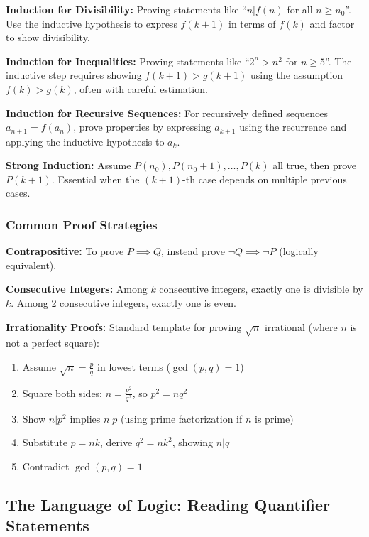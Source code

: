 \documentclass[12pt]{article}
\begin{document}
\textbf{Induction for Divisibility:} Proving statements like ``$n | f(n)$ for all $n \geq n_0$''. Use the inductive hypothesis to express $f(k+1)$ in terms of $f(k)$ and factor to show divisibility.

\textbf{Induction for Inequalities:} Proving statements like ``$2^n > n^2$ for $n \geq 5$''. The inductive step requires showing $f(k+1) > g(k+1)$ using the assumption $f(k) > g(k)$, often with careful estimation.

\textbf{Induction for Recursive Sequences:} For recursively defined sequences $a_{n+1} = f(a_n)$, prove properties by expressing $a_{k+1}$ using the recurrence and applying the inductive hypothesis to $a_k$.

\textbf{Strong Induction:} Assume $P(n_0), P(n_0+1), \ldots, P(k)$ all true, then prove $P(k+1)$. Essential when the $(k+1)$-th case depends on multiple previous cases.

\subsubsection*{Common Proof Strategies}

\textbf{Contrapositive:} To prove $P \implies Q$, instead prove $\neg Q \implies \neg P$ (logically equivalent).

\textbf{Consecutive Integers:} Among $k$ consecutive integers, exactly one is divisible by $k$. Among 2 consecutive integers, exactly one is even.

\textbf{Irrationality Proofs:} Standard template for proving $\sqrt{n}$ irrational (where $n$ is not a perfect square):
\begin{enumerate}
    \item Assume $\sqrt{n} = \frac{p}{q}$ in lowest terms ($\gcd(p,q) = 1$)
    \item Square both sides: $n = \frac{p^2}{q^2}$, so $p^2 = nq^2$
    \item Show $n | p^2$ implies $n | p$ (using prime factorization if $n$ is prime)
    \item Substitute $p = nk$, derive $q^2 = nk^2$, showing $n | q$
    \item Contradict $\gcd(p,q) = 1$
\end{enumerate}

\subsection{The Language of Logic: Reading Quantifier Statements}
\end{document}
